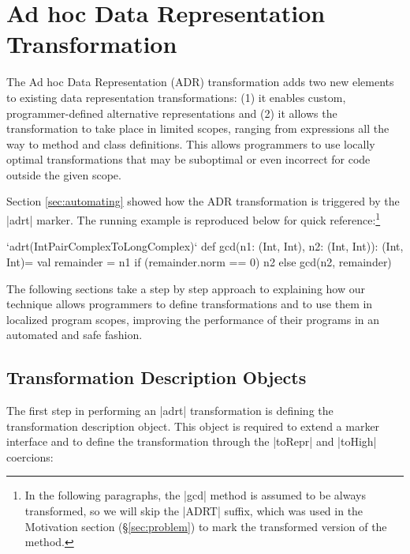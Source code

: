 \section{Ad hoc Data Representation Transformation}
\label{sec:ildl}

The Ad hoc Data Representation (ADR) transformation adds two new elements to existing data representation transformations: (1) it enables custom, programmer-defined alternative representations and (2) it allows the transformation to take place in limited scopes, ranging from expressions all the way to method and class definitions. This allows programmers to use locally optimal transformations that may be suboptimal or even incorrect for code outside the given scope.

Section \ref{sec:automating} showed how the ADR transformation is triggered by the |adrt| marker. The running example is reproduced below for quick reference:\footnote{In the following paragraphs, the |gcd| method is assumed to be always transformed, so we will skip the |ADRT| suffix, which was used in the Motivation section (\S\ref{sec:problem}) to mark the transformed version of the method.}

\begin{lstlisting-nobreak}
`adrt(IntPairComplexToLongComplex)` {
  def gcd(n1: (Int, Int), n2: (Int, Int)): (Int, Int)={
    val remainder = n1 %
    if (remainder.norm == 0) n2 else gcd(n2, remainder)
  }
}
\end{lstlisting-nobreak}

The following sections take a step by step approach to explaining how our technique allows programmers to define transformations and to use them in localized program scopes,  improving the performance of their programs in an automated and safe fashion.


\subsection{Transformation Description Objects}
\label{sec:ildl:custom}

The first step in performing an |adrt| transformation is defining the transformation description object. This object is required to extend a marker interface and to define the transformation through the |toRepr| and |toHigh| coercions:

